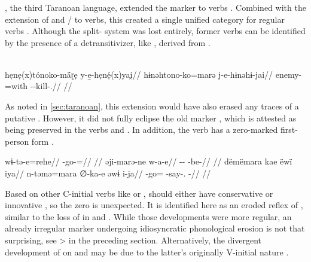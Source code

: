 \subsubsection{\carijo {}}
\label{sec:carijo}
\carijo, the third Taranoan language, extended the  marker  to  verbs \parencite[105--107]{meira1998proto}.
Combined with the extension of   and  / to  verbs, this created a single unified  category for regular verbs .
%
%
%
Although the split- system was lost entirely, former  verbs can be identified by the presence of a detransitivizer, like   , derived from   \parencite[179]{robayo2000avance}.

\carijo \parencite[][79]{koch1908hiana}\\
\begingl
\glpreamble hẹnẹ(x)tónoko-mā́ɽẹ y-e̱-hẹnẹ́(x)yai̯//
\gla hɨnəhtono-ko=marə j-e-hɨnəhɨ-jai//
\glb enemy-=with --kill-.//
\glft {}//
\endgl
\xe
%

As noted in \cref{sec:taranoan}, this extension would have also erased any traces of a putative \PTar {} .
However, it did not fully eclipse the old  marker , which is attested as being preserved in the verbs    and   .
In addition, the verb   has a zero-marked first-person form .

\carijo \parencite[][5, 42, personal communication]{guerrero2016karihona}
\begingl
\gla wɨ-tə-e=rehe//
\glb {}-go-=//
\glft {}//
\endgl
{}
\begingl
\gla əji-marə-ne w-a-e//
\glb {}-- -be-//
\glft {}//
\endgl
{}
\begingl
\glpreamble dëmëmara kae ëwï iya//
\gla n-təmə=mara ∅-ka-e əwɨ i-ja//
\glb {}-go= -say-.  -//
\glft {}//
\endgl
\xe

Based on other C-initial verbs like   or  ,   should either have conservative  or innovative , so the zero is unexpected.
It is identified here as an eroded reflex of , similar to the loss of  in \ikpeng and \hixka.
While those developments were more regular, an already irregular marker undergoing idiosyncratic phonological erosion is not that surprising, see \akuriyo {} >  in the preceding section.
Alternatively, the divergent development of  on   and   may be due to the latter's originally V-initial nature .

